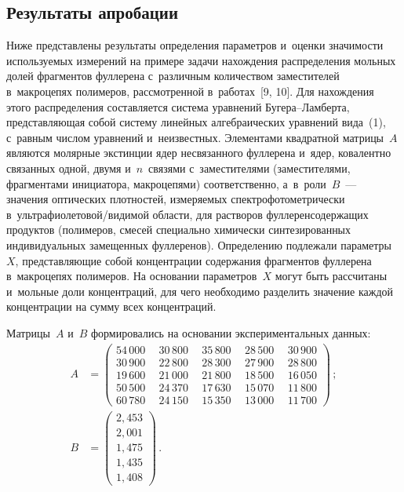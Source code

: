 \begin{multicols}{2}
  \section{Результаты апробации}

  Ниже представлены результаты определения параметров и~оценки
значимости используемых измерений на примере задачи нахождения
распределения мольных долей фрагментов фуллерена с~различным
количеством заместителей в~макроцепях полимеров, рассмотренной в~работах~[9, 10].
Для нахождения этого распределения составляется сис\-те\-ма
уравнений Бу\-ге\-ра--Лам\-бер\-та, пред\-став\-ля\-ющая собой сис\-те\-му линейных
алгебраических уравнений вида~(1), с~равным числом уравнений и~неизвестных. Элементами квадратной матрицы~$A$ являются молярные
экстинции ядер несвязанного фуллерена и~ядер, ковалентно связанных одной,
двумя и~$n$~связями с~заместителями (заместителями, фрагментами
инициатора, макроцепями) соответственно, а~в~роли~$B$~--- значения
оптических плотностей, измеряемых спектрофотометрически в~ульт\-ра\-фио\-ле\-то\-вой/ви\-ди\-мой
области, для растворов фуллеренсодержащих продуктов (полимеров, смесей
специально химически синтезированных индивидуальных замещенных
фуллеренов). Определению подлежали параметры~$X$, представляющие собой
концентрации содержания фрагментов фуллерена в~макроцепях полимеров. На
основании параметров~$X$ могут быть рассчитаны и~мольные доли
концентраций, для чего необходимо разделить значение каждой концентрации
на сумму всех концентраций.

  Матрицы~$A$ и~$B$ формировались на основании экспериментальных
данных:
\begin{align*}
  A&=\begin{pmatrix}
  54\,000\ & \ 30\,800\ & \ 35\,800\ & \ 28\,500\ & \ 30\,900\\
  30\,900\ & \ 22\,800\ & \ 28\,300\ & \ 27\,900\ & \ 28\,800\\
  19\,600\ & \ 21\,000\ & \ 21\,800\ & \ 18\,500\ &\  16\,050\\
  50\,500\ & \ 24\,370\ & \ 17\,630\ & \ 15\,070\ & \ 11\,800\\
  60\,780\ & \ 24\,150\ & \ 15\,350\ & \ 13\,000\ & \ 11\,700
  \end{pmatrix}\,;\\
   B&=
  \begin{pmatrix}
  2{,}453\\ 2{,}001 \\ 1{,}475 \\1{,}435\\ 1{,}408
  \end{pmatrix}\,.
  \end{align*}


\end{multicols}
